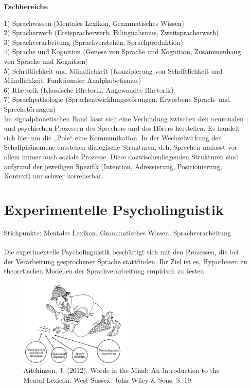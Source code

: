 \documentclass[11pt]{book}
\begin{document}
\textbf{Fachbereiche}

1)	Sprachwissen (Mentales Lexikon, Grammatisches Wissen)\\
2)	Spracherwerb (Erstspracherwerb, Bilingualismus, Zweitspracherwerb)\\
3)	Sprachverarbeitung (Sprachverstehen, Sprachproduktion)\\
4)	Sprache und Kognition (Genese von Sprache und Kognition, Zusammenhang von Sprache und Kognition)\\
5)	 Schriftlichkeit und Mündlichkeit (Konzipierung von Schriftlichkeit und Mündlichkeit, Funktionaler Analphabetismus)\\
6)	Rhetorik (Klassische Rhetorik, Angewandte Rhetorik)\\
7)	Sprachpathologie (Sprachentwicklungsstörungen, Erworbene Sprach- und Sprechstörungen)\\

Im signalphonetischen Band lässt sich eine Verbindung zwischen den neuronalen und psychischen Prozessen des Sprechers und des Hörers herstellen. Es handelt sich hier um die „Pole“ eine Kommunikation. In der Wechselwirkung der Schallphänomene entstehen dialogische Strukturen, d.\,h. Sprechen umfasst vor allem immer auch soziale Prozesse. Diese dazwischenliegenden Strukturen sind aufgrund der jeweiligen Spezifik (Intention, Adressierung, Positionierung, Kontext) nur schwer korrelierbar.


\section{Experimentelle Psycholinguistik}
Stichpunkte: Mentales Lexikon, Grammatisches Wissen, Sprachverarbeitung\\
\\
Die experimentelle Psycholinguistik beschäftigt sich mit den Prozessen, die bei der Verarbeitung gesprochener Sprache stattfinden. Ihr Ziel ist es, Hypothesen zu theoretischen Modellen der Sprachverarbeitung empirisch zu testen.\\
\begin{figure}[htbp]
\begin{center}
\includegraphics[width=0.5\textwidth]{grafiken/psycholinguistik/detektiv}
\caption{Aitchinson, J. (2012). Words in the Mind: An Introduction to the Mental Lexicon. West Sussex: John Wiley \& Sons. S. 19.}
\label{psy1}
\end{center}
\end{figure}
\newpage
\end{document}
